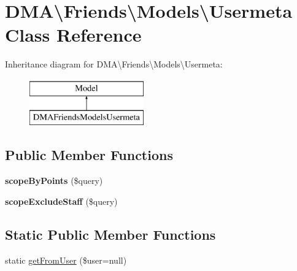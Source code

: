 \hypertarget{classDMA_1_1Friends_1_1Models_1_1Usermeta}{\section{D\-M\-A\textbackslash{}Friends\textbackslash{}Models\textbackslash{}Usermeta Class Reference}
\label{classDMA_1_1Friends_1_1Models_1_1Usermeta}
}
Inheritance diagram for D\-M\-A\textbackslash{}Friends\textbackslash{}Models\textbackslash{}Usermeta\-:\begin{figure}[H]
\begin{center}
\leavevmode
\includegraphics[height=2.000000cm]{d6/d87/classDMA_1_1Friends_1_1Models_1_1Usermeta}
\end{center}
\end{figure}
\subsection*{Public Member Functions}
\begin{DoxyCompactItemize}
\item 
\hypertarget{classDMA_1_1Friends_1_1Models_1_1Usermeta_ae00ecaf0d62b1ac7adc77184ae2fcbfa}{{\bfseries scope\-By\-Points} (\$query)}\label{classDMA_1_1Friends_1_1Models_1_1Usermeta_ae00ecaf0d62b1ac7adc77184ae2fcbfa}

\item 
\hypertarget{classDMA_1_1Friends_1_1Models_1_1Usermeta_a9b2ffa9c768ce6346269295d54d5cf4b}{{\bfseries scope\-Exclude\-Staff} (\$query)}\label{classDMA_1_1Friends_1_1Models_1_1Usermeta_a9b2ffa9c768ce6346269295d54d5cf4b}

\end{DoxyCompactItemize}
\subsection*{Static Public Member Functions}
\begin{DoxyCompactItemize}
\item 
static \hyperlink{classDMA_1_1Friends_1_1Models_1_1Usermeta_a9cfb688f15d66ee5a34c6437316d5d71}{get\-From\-User} (\$user=null)
\end{DoxyCompactItemize}
